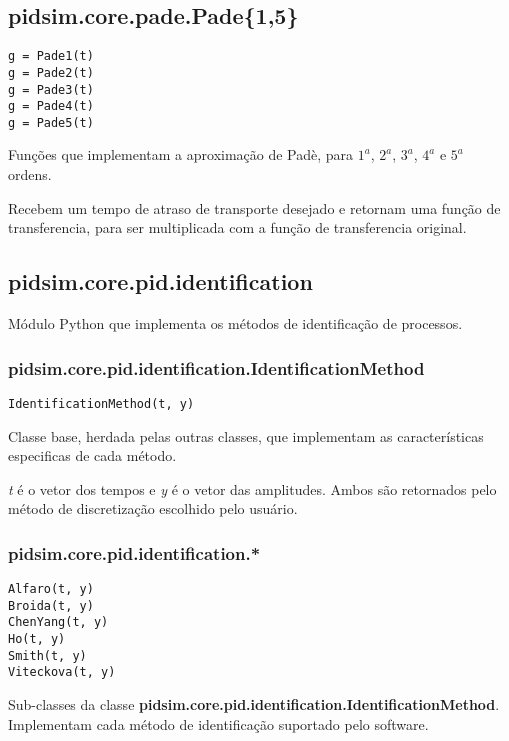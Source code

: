\subsection{pidsim.core.pade.Pade\{1,5\}}

    \begin{verbatim}
g = Pade1(t)
g = Pade2(t)
g = Pade3(t)
g = Pade4(t)
g = Pade5(t)
    \end{verbatim}
    
    Funções que implementam a aproximação de Padè, para $1^a$, $2^a$, $3^a$,
    $4^a$ e $5^a$ ordens.
    
    Recebem um tempo de atraso de transporte desejado e retornam uma
    função de transferencia, para ser multiplicada com a função de transferencia
    original.

\subsection{pidsim.core.pid.identification}
    
    Módulo Python que implementa os métodos de identificação de processos.
    
    \subsubsection{pidsim.core.pid.identification.IdentificationMethod}
        
        \begin{verbatim}
IdentificationMethod(t, y)
        \end{verbatim}
        
        Classe base, herdada pelas outras classes, que implementam as
        características especificas de cada método.
        
        \textit{t} é o vetor dos tempos e \textit{y} é o vetor das amplitudes.
        Ambos são retornados pelo método de discretização escolhido pelo
        usuário.
    
    \subsubsection{pidsim.core.pid.identification.*}
        
        \begin{verbatim}
Alfaro(t, y)
Broida(t, y)
ChenYang(t, y)
Ho(t, y)
Smith(t, y)
Viteckova(t, y)
        \end{verbatim}
        
        Sub-classes da classe \textbf{pidsim.core.pid.identification.IdentificationMethod}.
        Implementam cada método de identificação suportado pelo software.

